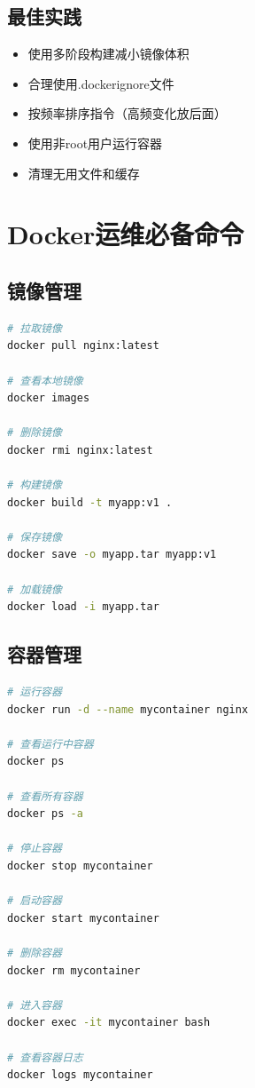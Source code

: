 \documentclass[12pt,UTF8]{ctexbook}
\begin{document}
\subsection{最佳实践}

\begin{itemize}
    \item 使用多阶段构建减小镜像体积
    \item 合理使用.dockerignore文件
    \item 按频率排序指令（高频变化放后面）
    \item 使用非root用户运行容器
    \item 清理无用文件和缓存
\end{itemize}

\section{Docker运维必备命令}
\label{sec:docker-commands}

\subsection{镜像管理}

\begin{lstlisting}[language=bash]
# 拉取镜像
docker pull nginx:latest

# 查看本地镜像
docker images

# 删除镜像
docker rmi nginx:latest

# 构建镜像
docker build -t myapp:v1 .

# 保存镜像
docker save -o myapp.tar myapp:v1

# 加载镜像
docker load -i myapp.tar
\end{lstlisting}

\subsection{容器管理}

\begin{lstlisting}[language=bash]
# 运行容器
docker run -d --name mycontainer nginx

# 查看运行中容器
docker ps

# 查看所有容器
docker ps -a

# 停止容器
docker stop mycontainer

# 启动容器
docker start mycontainer

# 删除容器
docker rm mycontainer

# 进入容器
docker exec -it mycontainer bash

# 查看容器日志
docker logs mycontainer
\end{lstlisting}
\end{document}
